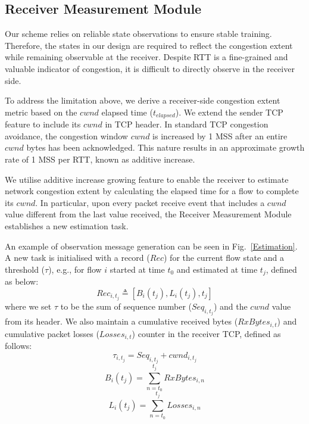 \documentclass[journal]{IEEEtran}
\begin{document}
\subsection{Receiver Measurement Module}
Our scheme relies on reliable state observations to ensure stable training. Therefore, the states in our design are required to reflect the congestion extent while remaining observable at the receiver. Despite RTT is a fine-grained and valuable indicator of congestion, it is difficult to directly observe in the receiver side.

To address the limitation above, we derive a receiver-side congestion extent metric based on the $cwnd$ elapsed time ($t_{elapsed}$). We extend the sender TCP feature to include its $cwnd$ in TCP header. 
In standard TCP congestion avoidance, the congestion window $cwnd$ is increased by 1 MSS after an entire $cwnd$ bytes has been acknowledged. This nature results in an approximate growth rate of 1 MSS per RTT, known as additive increase.

We utilise additive increase growing feature to enable the receiver to estimate network congestion extent by calculating the elapsed time for a flow to complete its $cwnd$.
In particular, upon every packet receive event that includes a $cwnd$ value different from the last value received, the Receiver Measurement Module establishes a new estimation task.

An example of observation message generation can be seen in Fig.~\ref{Estimation}. A new task is initialised with a record ($Rec$) for the current flow state and a threshold ($\tau$), e.g., for flow $i$ started at time $t_0$ and estimated at time $t_j$, defined as below:
\begin{equation}
  Rec_{i,t_j}\triangleq[B_i(t_j), L_i(t_j), t_j]
\end{equation} 
where we set $\tau$ to be the sum of sequence number ($Seq_{i,t_j}$) and the $cwnd$ value from its header. We also maintain a cumulative received bytes ($RxBytes_{i,t}$) and cumulative packet losses ($Losses_{i,t}$) counter in the receiver TCP, defined as follows:
\begin{equation}
  \tau_{i,t_j} = Seq_{i, t_j} + cwnd_{i,t_j}
\end{equation}
\begin{equation}
  B_i(t_j) = \sum_{n = t_0}^{t_j} Rx Bytes_{i, n}
\end{equation} 
\begin{equation}
  L_i(t_j) = \sum_{n= t_0}^{t_j}Losses_{i, n}
\end{equation} 
\end{document}
